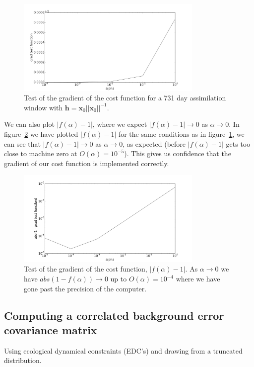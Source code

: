 \documentclass[11pt]{article}
\begin{document}
\begin{figure}[ht]
    \centering
    \includegraphics[width=0.8\textwidth]{gradtestone.png}
    \caption{Test of the gradient of the cost function for a 731 day assimilation window with $\textbf{h}=\textbf{x}_0||\textbf{x}_0||^{-1}$.}
    \label{fig:testgradcostone}
\end{figure}

We can also plot $|f(\alpha)-1|$, where we expect $|f(\alpha)-1| \rightarrow 0$ as $\alpha \rightarrow 0$.  In figure~\ref{fig:testgradcost} we have plotted $|f(\alpha)-1|$ for the same conditions as in figure~\ref{fig:testgradcostone}, we can see that $|f(\alpha) - 1| \rightarrow 0$ as $\alpha \rightarrow 0$, as expected (before $|f(\alpha)-1|$ gets too close to machine zero at $O(\alpha) = 10^{-5}$). This gives us confidence that the gradient of our cost function is implemented correctly.
\begin{figure}[ht]
    \centering
    \includegraphics[width=0.8\textwidth]{testgradcost1.png}
    \caption{Test of the gradient of the cost function, $|f(\alpha) -1|$. As $\alpha \rightarrow 0$ we have $abs(1 - f(\alpha)) \rightarrow 0$ up to $O(\alpha) = 10^{-4}$ where we have gone past the precision of the computer.}
    \label{fig:testgradcost}
\end{figure}

\subsection{Computing a correlated background error covariance matrix}
Using ecological dynamical constraints (EDC's) and drawing from a truncated distribution.
\end{document}
